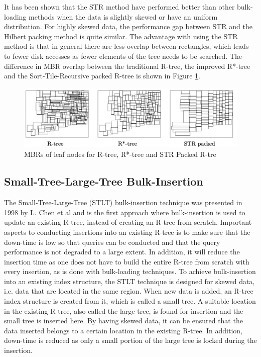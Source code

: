 \noindent
It has been shown that the STR method have performed better than other bulk-loading methods when the data is slightly skewed or have an uniform distribution. For highly skewed data, the performance gap between STR and the Hilbert packing method is quite similar\cite{STR}. The advantage with using the STR method is that in general there are less overlap between rectangles, which leads to fewer disk accesses as fewer elements of the tree needs to be searched. The difference in MBR overlap between the traditional R-tree, the improved R*-tree and the Sort-Tile-Recursive packed R-tree is shown in Figure \ref{fig:STRTree}.

\begin{figure}[ht]
    \centering
    \includegraphics[scale=0.6]{figures/STR.png}
    \caption{MBRs of leaf nodes for R-tree, R*-tree and STR Packed R-tre\cite{RTreesTheoryApplications}}
    \label{fig:STRTree}
\end{figure}

\subsection{Small-Tree-Large-Tree Bulk-Insertion}
The Small-Tree-Large-Tree (STLT) bulk-insertion technique was presented in 1998 by L. Chen et al\cite{STLT} and is the first approach where bulk-insertion is used to update an existing R-tree, instead of creating an R-tree from scratch. Important aspects to conducting insertions into an existing R-tree is to make sure that the down-time is low so that queries can be conducted and that the query performance is not degraded to a large extent. In addition, it will reduce the insertion time as one does not have to build the entire R-tree from scratch with every insertion, as is done with bulk-loading techniques. To achieve bulk-insertion into an existing index structure, the STLT technique is designed for skewed data, i.e. data that are located in the same region. When new data is added, an R-tree index structure is created from it, which is called a small tree. A suitable location in the existing R-tree, also called the large tree, is found for insertion and the small tree is inserted here. By having skewed data, it can be ensured that the data inserted belongs to a certain location in the existing R-tree. In addition, down-time is reduced as only a small portion of the large tree is locked during the insertion.\newline

